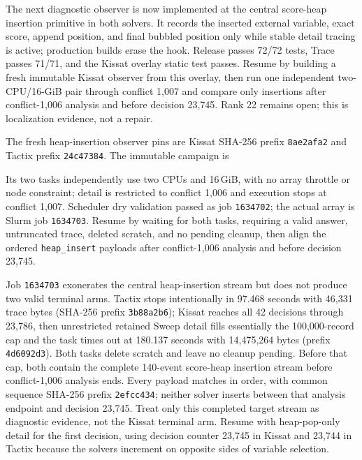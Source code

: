 \documentclass[11pt]{article}
\newcommand{\code}[1]{\texttt{#1}}
\newcommand{\artifact}[1]{\path{#1}}
\begin{document}
The next diagnostic observer is now implemented at the central score-heap
insertion primitive in both solvers. It records the inserted external
variable, exact score, append position, and final bubbled position only while
stable detail tracing is active; production builds erase the hook. Release
passes 72/72 tests, Trace passes 71/71, and the Kissat overlay static test
passes. Resume by building a fresh immutable Kissat observer from this
overlay, then run one independent two-CPU/16-GiB pair through conflict 1,007
and compare only insertions after conflict-1,006 analysis and before decision
23,745. Rank 22 remains open; this is localization evidence, not a repair.

The fresh heap-insertion observer pins are Kissat SHA-256 prefix
\code{8ae2afa2} and Tactix prefix \code{24c47384}. The immutable campaign is
\begin{center}\small\artifact{20260819-1412-tierd-rank22-c1006-heap-inserts}\end{center}
Its two tasks independently use two CPUs and 16\,GiB, with no array throttle
or node constraint; detail is restricted to conflict 1,006 and execution stops
at conflict 1,007. Scheduler dry validation passed as job \code{1634702}; the
actual array is Slurm job \code{1634703}. Resume by waiting for both tasks,
requiring a valid answer, untruncated trace, deleted scratch, and no pending
cleanup, then align the ordered \code{heap\_insert} payloads after
conflict-1,006 analysis and before decision 23,745.

Job \code{1634703} exonerates the central heap-insertion stream but does not
produce two valid terminal arms. Tactix stops intentionally in 97.468 seconds
with 46,331 trace bytes (SHA-256 prefix \code{3b88a2b6}); Kissat reaches all
42 decisions through 23,786, then unrestricted retained Sweep detail fills
essentially the 100,000-record cap and the task times out at 180.137 seconds
with 14,475,264 bytes (prefix \code{4d6092d3}). Both tasks delete scratch and
leave no cleanup pending. Before that cap, both contain the complete 140-event
score-heap insertion stream before conflict-1,006 analysis ends. Every payload
matches in order, with common sequence SHA-256 prefix \code{2efcc434}; neither
solver inserts between that analysis endpoint and decision 23,745. Treat only
this completed target stream as diagnostic evidence, not the Kissat terminal
arm. Resume with heap-pop-only detail for the first decision, using decision
counter 23,745 in Kissat and 23,744 in Tactix because the solvers increment on
opposite sides of variable selection.
\end{document}

